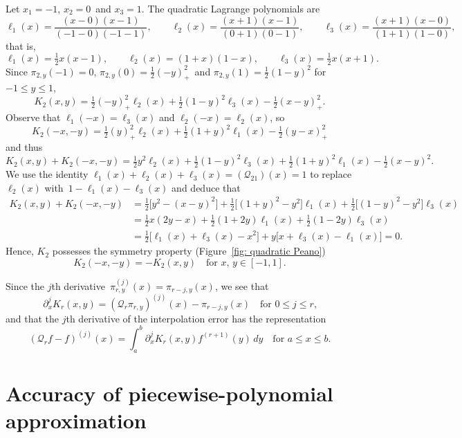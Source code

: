 \begin{example}\label{example: quadratic interp}
Let $x_1=-1$, $x_2=0$~and $x_3=1$.  The quadratic Lagrange polynomials are
\[
\ell_1(x)=\frac{(x-0)(x-1)}{(-1-0)(-1-1)},\qquad
\ell_2(x)=\frac{(x+1)(x-1)}{(0+1)(0-1)},\qquad
\ell_3(x)=\frac{(x+1)(x-0)}{(1+1)(1-0)},
\]
that is,
\[
\ell_1(x)=\tfrac12x(x-1),\qquad
\ell_2(x)=(1+x)(1-x),\qquad
\ell_3(x)=\tfrac12x(x+1).
\]
Since $\pi_{2,y}(-1)=0$, $\pi_{2,y}(0)=\tfrac12(-y)_+^2$~and 
$\pi_{2,y}(1)=\tfrac12(1-y)^2$ for~$-1\le y\le 1$,
\begin{equation}\label{eq: quadratic Peano}
K_2(x,y)=\tfrac12(-y)_+^2\ell_2(x)+\tfrac12(1-y)^2\ell_3(x)-\tfrac12(x-y)_+^2.
\end{equation}
Observe that $\ell_1(-x)=\ell_3(x)$ and $\ell_2(-x)=\ell_2(x)$, so
\[
K_2(-x,-y)=\tfrac12(y)_+^2\ell_2(x)+\tfrac12(1+y)^2\ell_1(x)-\tfrac12(y-x)_+^2
\]
and thus
\[
K_2(x,y)+K_2(-x,-y)=\tfrac12y^2\ell_2(x)+\tfrac12(1-y)^2\ell_3(x)
	+\tfrac12(1+y)^2\ell_1(x)-\tfrac12(x-y)^2.
\]
We use the identity $\ell_1(x)+\ell_2(x)+\ell_3(x)=(\mathcal{Q}_21)(x)=1$ to
replace $\ell_2(x)$ with~$1-\ell_1(x)-\ell_3(x)$ and deduce that
\begin{align*}
K_2(x,y)+K_2(-x,-y)&=\tfrac12\bigl[y^2-(x-y)^2\bigr]
	+\tfrac12\bigl[(1+y)^2-y^2\bigr]\ell_1(x)
	+\tfrac12\bigl[(1-y)^2-y^2\bigr]\ell_3(x)\\
	&=\tfrac12x(2y-x)+\tfrac12(1+2y)\ell_1(x)+\tfrac12(1-2y)\ell_3(x)\\
	&=\tfrac12\bigl[\ell_1(x)+\ell_3(x)-x^2\bigr]
	+y\bigl[x+\ell_3(x)-\ell_1(x)\bigr]=0.
\end{align*}
Hence, $K_2$ possesses the symmetry property (Figure~\ref{fig: quadratic Peano})
\begin{equation}\label{eq: K2 symmetry}
K_2(-x,-y)=-K_2(x,y)\quad\text{for $x$, $y\in[-1,1]$.}
\end{equation}
\end{example}

Since the $j$th derivative~$\pi_{r,y}^{(j)}(x)=\pi_{r-j,y}(x)$, we see that
\[
\partial_x^jK_r(x,y)=(\mathcal{Q}_r\pi_{r,y})^{(j)}(x)-\pi_{r-j,y}(x)
\quad\text{for $0\le j\le r$,}
\]
and that the $j$th derivative of the interpolation error has the representation
\begin{equation}\label{eq: Qr f error deriv}
(\mathcal{Q}_rf-f)^{(j)}(x)=\int_a^b\partial_x^j K_r(x,y)f^{(r+1)}(y)\,dy
\quad\text{for $a\le x\le b$.}
\end{equation}


\section{Accuracy of piecewise-polynomial approximation}

